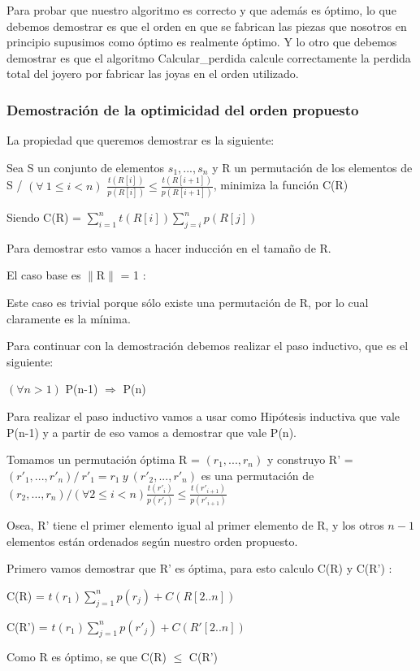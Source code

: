 Para probar que nuestro algoritmo es correcto y que además es óptimo, lo que debemos demostrar es que el orden en que se fabrican las piezas que nosotros en principio supusimos como óptimo es realmente óptimo. Y lo otro que debemos demostrar es que el algoritmo Calcular\_perdida calcule correctamente la perdida total del joyero por fabricar las joyas en el orden utilizado.

\subsubsection{Demostración de la optimicidad del orden propuesto}
La propiedad que queremos demostrar es la siguiente:

Sea S un conjunto de elementos  ${s_1,...,s_n}$ y R un permutación de los elementos de S / $(\forall \ 1 \leq i  < n)$ $\frac{t(R[i])}{p(R[i])} \leq \frac{t(R[i+1])}{p(R[i+1])} $, minimiza la función C(R) 

Siendo C(R) = $\sum_{i=1}^{n} t(R[i]) \sum_{j=i}^{n}p(R[j]) $

Para demostrar esto vamos a hacer inducción en el tamaño de R.

El caso base  es $\|$R$\|$ = 1 :

Este caso es trivial porque sólo existe una permutación de R, por lo cual claramente es la mínima.

Para continuar con la demostración debemos realizar el paso inductivo, que es el siguiente:

$(\forall n > 1)$  P(n-1) $\Rightarrow$ P(n)

Para realizar el paso inductivo vamos a usar como Hipótesis inductiva que vale P(n-1) y a partir de eso vamos a demostrar que vale P(n).

Tomamos un permutación óptima R = $(r_1,...,r_n)$ y construyo R' = $(r'_1,...,r'_n) / \  r'_1 = r_1 \  y \ (r'_2,...,r'_n)$ es una permutación de $(r_2,...,r_n) / (\forall 2 \leq i  < n) \frac{t(r'_i)}{p(r'_i)} \leq \frac{t(r'_{i+1})}{p(r'_{i+1})} $

Osea, R' tiene el primer elemento igual al primer elemento de R, y los otros $n-1$ elementos están ordenados según nuestro orden propuesto.

Primero vamos demostrar que R' es óptima, para esto calculo C(R) y C(R') :

C(R) = $t(r_1) \sum_{j=1}^{n}p(r_j) + C(R[2..n]) $

C(R') = $t(r_1) \sum_{j=1}^{n}p(r'_j) + C(R'[2..n]) $

Como R es óptimo, se que C(R) $\leq$ C(R')

